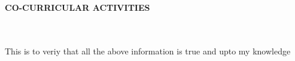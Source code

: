 \documentclass[a4paper,10pt]{article}
\newcommand{\lsep}{-0.5cm}
\newcommand{\resheading}[1]{{\small \colorbox{mygrey}{\begin{minipage}{0.975\textwidth}{\textbf{#1 \vphantom{p\^{E}}}}\end{minipage}}}}
\begin{document}
\resheading{\textbf{CO-CURRICULAR ACTIVITIES} }\\[\lsep]

\indent{}\\

\small{This is to veriy that all the above information is true and upto my knowledge}\\
\indent{\today}
\indent{}\\
\indent{}\\
\indent{}\\

\hspace*{14cm} 



%
%
\end{document}
